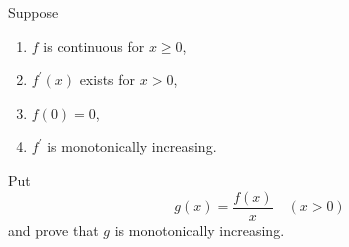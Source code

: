 \begin{exercise}
	Suppose
	\renewcommand{\labelenumi}{(\alph{enumi})}
	\begin{enumerate}
		\item $f$ is continuous for $x \geq 0$,
		\item $f^\prime \left( x \right)$ exists for $x > 0$,
		\item $f(0) = 0$,
		\item $f^\prime$ is monotonically increasing.
	\end{enumerate}
	Put
	\begin{equation*}
	g(x) = \frac{f(x)}{x} \quad \left( x > 0 \right)
	\end{equation*}
	and prove that $g$ is monotonically increasing.
\end{exercise}
